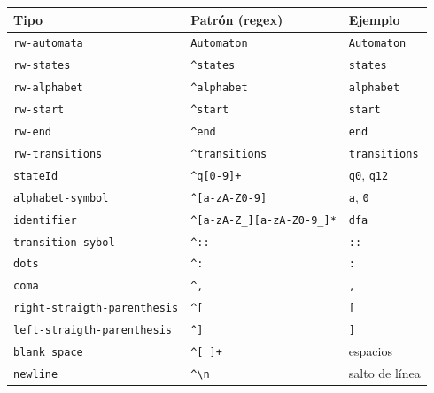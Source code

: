 \documentclass{article}
\begin{document}
\begin{center}
\begin{tabular}{|l|l|l|}
\hline
\textbf{Tipo} & \textbf{Patrón (regex)} & \textbf{Ejemplo} \\
\hline
\texttt{rw-automata}      & \texttt{Automaton}                             & \texttt{Automaton}   \\
\texttt{rw-states}        & \texttt{\textasciicircum states}               & \texttt{states}      \\
\texttt{rw-alphabet}      & \texttt{\textasciicircum alphabet}             & \texttt{alphabet}    \\
\texttt{rw-start}         & \texttt{\textasciicircum start}                & \texttt{start}       \\
\texttt{rw-end}           & \texttt{\textasciicircum end}                  & \texttt{end}         \\
\texttt{rw-transitions}   & \texttt{\textasciicircum transitions}          & \texttt{transitions} \\
\texttt{stateId}          & \texttt{\textasciicircum q[0-9]+}              & \texttt{q0}, \texttt{q12} \\
\texttt{alphabet-symbol}  & \texttt{\textasciicircum[a-zA-Z0-9]}           & \texttt{a}, \texttt{0} \\
\texttt{identifier}       & \texttt{\textasciicircum[a-zA-Z\_][a-zA-Z0-9\_]*} & \texttt{dfa} \\
\texttt{transition-sybol} & \texttt{\textasciicircum::}                    & \texttt{::}          \\
\texttt{dots}             & \texttt{\textasciicircum:}                     & \texttt{:}           \\
\texttt{coma}             & \texttt{\textasciicircum,}                     & \texttt{,}           \\
\texttt{right-straigth-parenthesis} & \texttt{\textasciicircum[}           & \texttt{[}           \\
\texttt{left-straigth-parenthesis}  & \texttt{\textasciicircum]}           & \texttt{]}           \\
\texttt{blank\_space}     & \texttt{\textasciicircum[ ]+}                  & espacios             \\
\texttt{newline}          & \texttt{\textasciicircum\textbackslash n}      & salto de línea       \\
\hline
\end{tabular}
\end{center}
\end{document}
